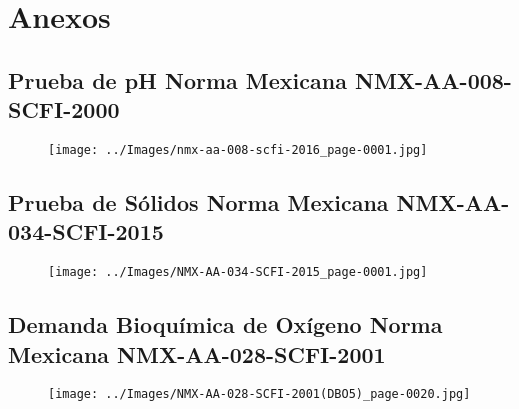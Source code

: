 \section*{Anexos}
\subsection*{Prueba de pH Norma Mexicana NMX-AA-008-SCFI-2000}
\begin{center}
	\begin{figure}[h]
		\texttt{[image: ../Images/nmx-aa-008-scfi-2016\_page-0001.jpg]}
	\end{figure}
\end{center}
\clearpage

\subsection*{Prueba de Sólidos Norma Mexicana NMX-AA-034-SCFI-2015}
\begin{center}
	\begin{figure}[h]
		\texttt{[image: ../Images/NMX-AA-034-SCFI-2015\_page-0001.jpg]}
	\end{figure}
\end{center}
\clearpage

\subsection*{Demanda Bioquímica de Oxígeno Norma Mexicana NMX-AA-028-SCFI-2001}
\begin{center} 
	\begin{figure}[h]
		\texttt{[image: ../Images/NMX-AA-028-SCFI-2001(DBO5)\_page-0020.jpg]}
	\end{figure}
\end{center}
\clearpage
